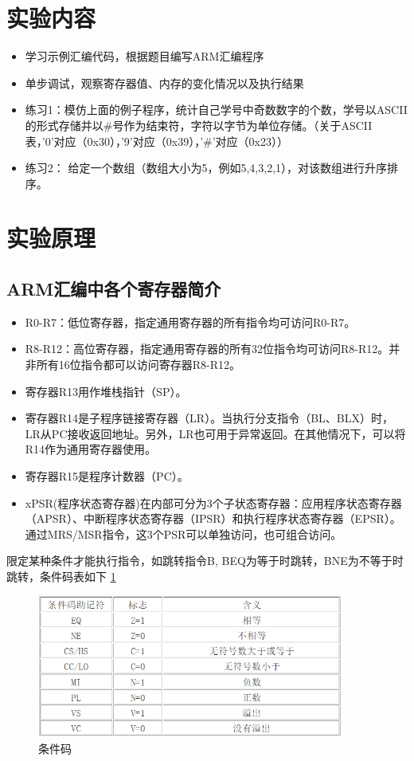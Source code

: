 \documentclass[a4paper,10pt,UTF8]{paper}
\numberwithin{equation}{section}
\numberwithin{figure}{section}
\begin{document}
\section{实验内容}
\begin{itemize}
  \item 学习示例汇编代码，根据题目编写ARM汇编程序
  \item 单步调试，观察寄存器值、内存的变化情况以及执行结果
  \item 练习1：模仿上面的例子程序，统计自己学号中奇数数字的个数，学号以ASCII的形式存储并以\#号作为结束符，字符以字节为单位存储。（关于ASCII表，'0'对应（0x30），'9'对应（0x39），'\#'对应（0x23））
  \item 练习2： 给定一个数组（数组大小为5，例如5,4,3,2,1），对该数组进行升序排序。
\end{itemize}


\section{实验原理}

\subsection{ARM汇编中各个寄存器简介
}

\begin{itemize}
  \item R0-R7：低位寄存器，指定通用寄存器的所有指令均可访问R0-R7。
  \item R8-R12：高位寄存器，指定通用寄存器的所有32位指令均可访问R8-R12。并非所有16位指令都可以访问寄存器R8-R12。
  \item 寄存器R13用作堆栈指针（SP）。
  \item 寄存器R14是子程序链接寄存器（LR）。当执行分支指令（BL、BLX）时，LR从PC接收返回地址。另外，LR也可用于异常返回。在其他情况下，可以将R14作为通用寄存器使用。
  \item 寄存器R15是程序计数器（PC）。
  \item xPSR(程序状态寄存器)在内部可分为3个子状态寄存器：应用程序状态寄存器（APSR）、中断程序状态寄存器（IPSR）和执行程序状态寄存器（EPSR）。通过MRS/MSR指令，这3个PSR可以单独访问，也可组合访问。

\end{itemize}


限定某种条件才能执行指令，如跳转指令B, BEQ为等于时跳转，BNE为不等于时跳转，条件码表如下 \ref{fig:1}

\begin{figure}[h]
  \centering
  \includegraphics[width=0.9\textwidth]{1.PNG}
  \caption{条件码}
  \label{fig:1}
\end{figure}
\end{document}
